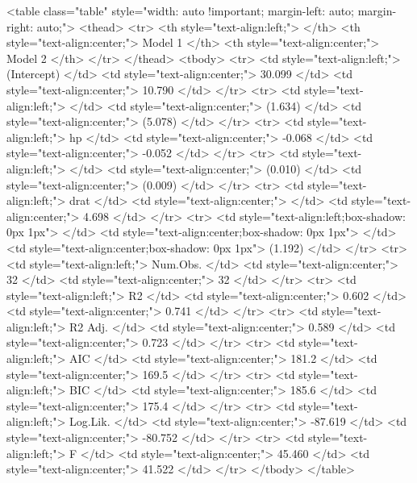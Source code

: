 <table class="table" style="width: auto !important; margin-left: auto; margin-right: auto;">
 <thead>
  <tr>
   <th style="text-align:left;">   </th>
   <th style="text-align:center;"> Model 1 </th>
   <th style="text-align:center;"> Model 2 </th>
  </tr>
 </thead>
<tbody>
  <tr>
   <td style="text-align:left;"> (Intercept) </td>
   <td style="text-align:center;"> 30.099 </td>
   <td style="text-align:center;"> 10.790 </td>
  </tr>
  <tr>
   <td style="text-align:left;">  </td>
   <td style="text-align:center;"> (1.634) </td>
   <td style="text-align:center;"> (5.078) </td>
  </tr>
  <tr>
   <td style="text-align:left;"> hp </td>
   <td style="text-align:center;"> -0.068 </td>
   <td style="text-align:center;"> -0.052 </td>
  </tr>
  <tr>
   <td style="text-align:left;">  </td>
   <td style="text-align:center;"> (0.010) </td>
   <td style="text-align:center;"> (0.009) </td>
  </tr>
  <tr>
   <td style="text-align:left;"> drat </td>
   <td style="text-align:center;">  </td>
   <td style="text-align:center;"> 4.698 </td>
  </tr>
  <tr>
   <td style="text-align:left;box-shadow: 0px 1px">  </td>
   <td style="text-align:center;box-shadow: 0px 1px">  </td>
   <td style="text-align:center;box-shadow: 0px 1px"> (1.192) </td>
  </tr>
  <tr>
   <td style="text-align:left;"> Num.Obs. </td>
   <td style="text-align:center;"> 32 </td>
   <td style="text-align:center;"> 32 </td>
  </tr>
  <tr>
   <td style="text-align:left;"> R2 </td>
   <td style="text-align:center;"> 0.602 </td>
   <td style="text-align:center;"> 0.741 </td>
  </tr>
  <tr>
   <td style="text-align:left;"> R2 Adj. </td>
   <td style="text-align:center;"> 0.589 </td>
   <td style="text-align:center;"> 0.723 </td>
  </tr>
  <tr>
   <td style="text-align:left;"> AIC </td>
   <td style="text-align:center;"> 181.2 </td>
   <td style="text-align:center;"> 169.5 </td>
  </tr>
  <tr>
   <td style="text-align:left;"> BIC </td>
   <td style="text-align:center;"> 185.6 </td>
   <td style="text-align:center;"> 175.4 </td>
  </tr>
  <tr>
   <td style="text-align:left;"> Log.Lik. </td>
   <td style="text-align:center;"> -87.619 </td>
   <td style="text-align:center;"> -80.752 </td>
  </tr>
  <tr>
   <td style="text-align:left;"> F </td>
   <td style="text-align:center;"> 45.460 </td>
   <td style="text-align:center;"> 41.522 </td>
  </tr>
</tbody>
</table>
